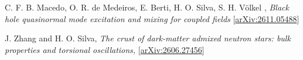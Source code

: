 \documentclass[11pt]{article}
\begin{document}

\setcounter{numPubs}{61}
\setcounter{pubCounter}{\value{numPubs}}

\begin{etaremune}[
        start=\value{pubCounter},
        topsep=0pt,
        partopsep=0pt]
    \item C. F. B. Macedo, O. R. de Medeiros, E. Berti, H. O. Silva, S. H. V\"olkel ,
    \emph{Black hole quasinormal mode excitation and mixing for coupled fields }
    [\href{https://arxiv.org/abs/2611.05488}{arXiv:2611.05488}]
    \item J. Zhang and H. O. Silva,
    \emph{The crust of dark-matter admixed neutron stars: bulk properties and torsional oscillations,}
    [\href{https://arxiv.org/abs/2606.27456}{arXiv:2606.27456}]
    \setcounter{pubCounter}{\value{enumi}}
\end{etaremune}
\end{document}
